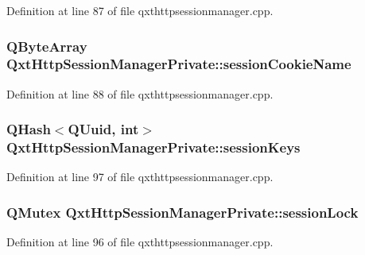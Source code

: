Definition at line 87 of file qxthttpsessionmanager.\-cpp.

\hypertarget{class_qxt_http_session_manager_private_afff38a099b0c4d6a1f7da9b5eca8fac6}{
\subsubsection[{session\-Cookie\-Name}]{\setlength{\rightskip}{0pt plus 5cm}Q\-Byte\-Array Qxt\-Http\-Session\-Manager\-Private\-::session\-Cookie\-Name}}\label{class_qxt_http_session_manager_private_afff38a099b0c4d6a1f7da9b5eca8fac6}


Definition at line 88 of file qxthttpsessionmanager.\-cpp.

\hypertarget{class_qxt_http_session_manager_private_a981d0670f9d5dbfcf02216b3dc977952}{
\subsubsection[{session\-Keys}]{\setlength{\rightskip}{0pt plus 5cm}Q\-Hash$<$Q\-Uuid, {\bf int}$>$ Qxt\-Http\-Session\-Manager\-Private\-::session\-Keys}}\label{class_qxt_http_session_manager_private_a981d0670f9d5dbfcf02216b3dc977952}


Definition at line 97 of file qxthttpsessionmanager.\-cpp.

\hypertarget{class_qxt_http_session_manager_private_a0773bccaca233732094d7327467a012d}{
\subsubsection[{session\-Lock}]{\setlength{\rightskip}{0pt plus 5cm}Q\-Mutex Qxt\-Http\-Session\-Manager\-Private\-::session\-Lock}}\label{class_qxt_http_session_manager_private_a0773bccaca233732094d7327467a012d}


Definition at line 96 of file qxthttpsessionmanager.\-cpp.


